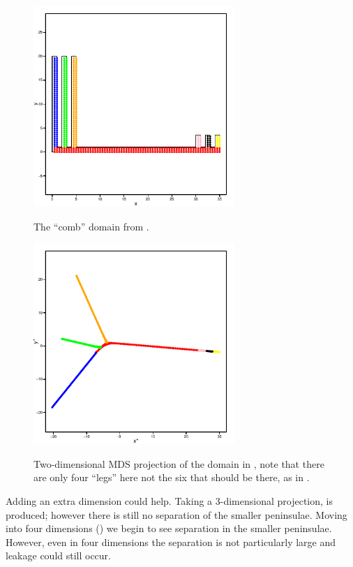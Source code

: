 \begin{figure}
\centering
\includegraphics[width=3in]{mds/figs/comb.pdf} \\
\caption{The ``comb'' domain from .}
\label{mds-comb}
\end{figure}

\begin{figure}
\centering
\includegraphics[width=3in]{mds/figs/comb-2d.pdf} \\
\caption{Two-dimensional MDS projection of the domain in , note that there are only four ``legs'' here not the six that should be there, as in .}
\label{mds-comb-2d}
\end{figure}

Adding an extra dimension could help. Taking a 3-dimensional projection,  is produced; however there is still no separation of the smaller peninsulae. Moving into four dimensions () we begin to see separation in the smaller peninsulae. However, even in four dimensions the separation is not particularly large and leakage could still occur.

